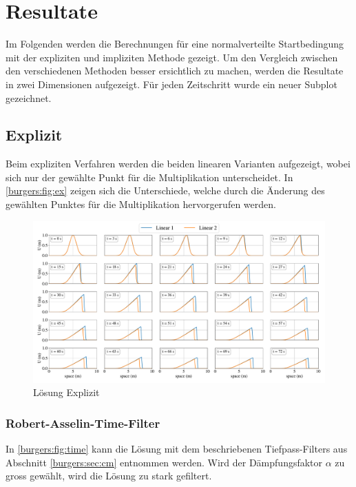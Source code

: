 %
%
\section{Resultate
\label{burgers:section:results}}

	Im Folgenden werden die Berechnungen f\"ur eine normalverteilte Startbedingung mit der expliziten und impliziten Methode gezeigt.
	Um den Vergleich zwischen den verschiedenen Methoden besser ersichtlich zu machen, werden die Resultate in zwei Dimensionen aufgezeigt.
	F\"ur jeden Zeitschritt wurde ein neuer Subplot gezeichnet.

	\subsection{Explizit}

	Beim expliziten Verfahren werden die beiden linearen Varianten aufgezeigt,
	wobei sich nur der gew\"ahlte Punkt f\"ur die Multiplikation unterscheidet.
	In \autoref{burgers:fig:ex} zeigen sich die Unterschiede, welche durch die \"Anderung des gewählten Punktes für die Multiplikation hervorgerufen werden.


    \begin{figure}
	\centering
	\includegraphics[width=1\textwidth]{papers/burgers/BurgersEquation/lin_paper.pdf}
	\caption{L\"osung Explizit}
	\label{burgers:fig:ex}
	\end{figure}

	\subsubsection{Robert-Asselin-Time-Filter}
	In \autoref{burgers:fig:time} kann die L\"osung mit dem beschriebenen Tiefpass-Filters aus Abschnitt \ref{burgers:sec:cm} entnommen werden.
	Wird der D\"ampfungsfaktor $\alpha$ zu gross gew\"ahlt, wird die L\"osung zu stark gefiltert.

